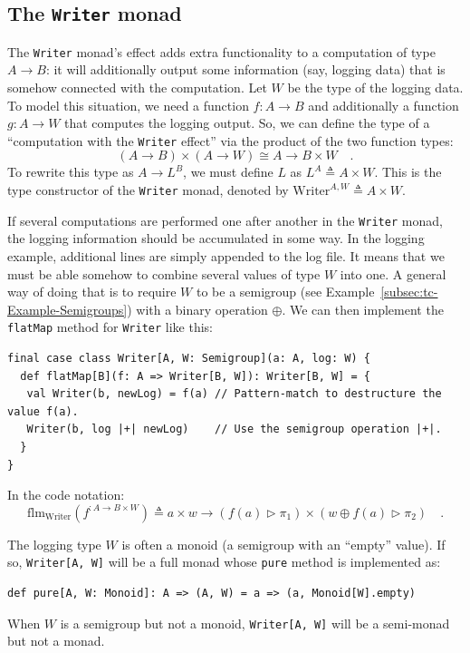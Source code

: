 \subsection{The \texttt{Writer} monad}

The \lstinline!Writer!
monad\textsf{'}s effect adds extra functionality to a computation of type $A\rightarrow B$:
it will additionally output some information (say, logging data) that
is somehow connected with the computation. Let $W$ be the type of
the logging data. To model this situation, we need a function $f:A\rightarrow B$
and additionally a function $g:A\rightarrow W$ that computes the
logging output. So, we can define the type of a \textsf{``}computation with
the \lstinline!Writer! effect\textsf{''} via the product of the two function
types:
\[
\left(A\rightarrow B\right)\times\left(A\rightarrow W\right)\cong A\rightarrow B\times W\quad.
\]
To rewrite this type as $A\rightarrow L^{B}$, we must define $L$
as $L^{A}\triangleq A\times W$. This is the type constructor of the
\lstinline!Writer! monad, denoted by $\text{Writer}^{A,W}\triangleq A\times W$.

If several computations are performed one after another in the \lstinline!Writer!
monad, the logging information should be accumulated in some way.
In the logging example, additional lines are simply appended to the
log file. It means that we must be able somehow to combine several
values of type $W$ into one. A general way of doing that is to require
$W$ to be a semigroup (see Example~\ref{subsec:tc-Example-Semigroups})
with a binary operation $\oplus$. We can then implement the \lstinline!flatMap!
method for \lstinline!Writer! like this:
\begin{lstlisting}
final case class Writer[A, W: Semigroup](a: A, log: W) {
  def flatMap[B](f: A => Writer[B, W]): Writer[B, W] = {
   val Writer(b, newLog) = f(a) // Pattern-match to destructure the value f(a).
   Writer(b, log |+| newLog)    // Use the semigroup operation |+|.
  }
}
\end{lstlisting}
In the code notation:
\[
\text{flm}_{\text{Writer}}(f^{:A\rightarrow B\times W})\triangleq a\times w\rightarrow\left(f(a)\triangleright\pi_{1}\right)\times\left(w\oplus f(a)\triangleright\pi_{2}\right)\quad.
\]

The logging type $W$ is often a monoid (a semigroup with an \textsf{``}empty\textsf{''}
value). If so, \lstinline!Writer[A, W]! will be a full monad whose
\lstinline!pure! method is implemented as:
\begin{lstlisting}
def pure[A, W: Monoid]: A => (A, W) = a => (a, Monoid[W].empty)
\end{lstlisting}
When $W$ is a semigroup but not a monoid, \lstinline!Writer[A, W]!
will be a semi-monad but not a monad. 

